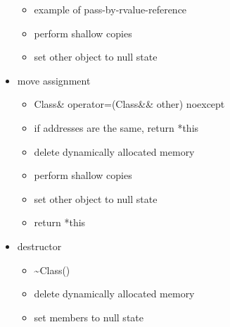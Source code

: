 \documentclass{article}
\begin{document}
\begin{multicols}{2}
\begin{itemize}
\begin{itemize}
            \item example of pass-by-rvalue-reference
            \item perform shallow copies
            \item set other object to null state
        \end{itemize}
    \vspace{-\baselineskip}
    \item move assignment
    \vspace{-.7\baselineskip}
        \begin{itemize}
            \item Class\& operator=(Class\&\& other) noexcept
            \item if addresses are the same, return *this
            \item delete dynamically allocated memory
            \item perform shallow copies
            \item set other object to null state
            \item return *this
        \end{itemize}
    \vspace{-\baselineskip}
    \item destructor
    \vspace{-.7\baselineskip}
        \begin{itemize}
            \item \textasciitilde Class()
            \item delete dynamically allocated memory
            \item set members to null state
        \end{itemize}
    \vspace{-.7\baselineskip}
\end{itemize}


\end{multicols}
\end{document}
